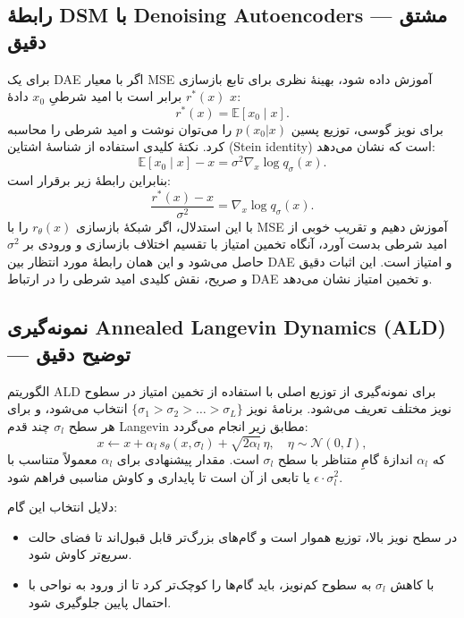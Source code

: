 \subsection{رابطهٔ DSM با Denoising Autoencoders — مشتق دقیق}
برای یک DAE اگر با معیار MSE آموزش داده شود، بهینهٔ نظری برای تابع بازسازی $r^*(x)$ برابر است با امید شرطیِ $x_0$ دادهٔ $x$:
\begin{equation}
r^*(x) = \mathbb{E}[x_0 \mid x].
\end{equation}
برای نویز گوسی، توزیع پسین $p(x_0|x)$ را می‌توان نوشت و امید شرطی را محاسبه کرد. نکتهٔ کلیدی استفاده از شناسهٔ اشتاین (Stein identity) است که نشان می‌دهد:
\begin{equation}\label{eq:dae_posterior}
\mathbb{E}[x_0 \mid x] - x = \sigma^2 \nabla_x \log q_{\sigma}(x).
\end{equation}
بنابراین رابطهٔ زیر برقرار است:
\begin{equation}
\frac{r^*(x) - x}{\sigma^2} = \nabla_x \log q_{\sigma}(x).
\end{equation}
با این استدلال، اگر شبکهٔ بازسازی $r_{\theta}(x)$ را با MSE آموزش دهیم و تقریب خوبی از امید شرطی بدست آورد، آنگاه تخمین امتیاز با تقسیم اختلاف بازسازی و ورودی بر $\sigma^2$ حاصل می‌شود و این همان رابطهٔ مورد انتظار بین DAE و امتیاز است. این اثبات دقیق و صریح، نقش کلیدی امید شرطی را در ارتباط DAE و تخمین امتیاز نشان می‌دهد.

\subsection{نمونه‌گیری Annealed Langevin Dynamics (ALD) — توضیح دقیق}
الگوریتم ALD برای نمونه‌گیری از توزیع اصلی با استفاده از تخمین امتیاز در سطوح نویز مختلف تعریف می‌شود. برنامهٔ نویز \(\{\sigma_1>\sigma_2>\dots>\sigma_L\}\) انتخاب می‌شود، و برای هر سطح \(\sigma_l\) چند قدم Langevin مطابق زیر انجام می‌گردد:
\begin{equation}\label{eq:ald_step}
x \leftarrow x + \alpha_l\, s_{\theta}(x,\sigma_l) + \sqrt{2\alpha_l}\,\eta, \quad \eta\sim\mathcal{N}(0,I),
\end{equation}
که \(\alpha_l\) اندازهٔ گامِ متناظر با سطح \(\sigma_l\) است. مقدار پیشنهادی برای \(\alpha_l\) معمولاً متناسب با \(\epsilon \cdot \sigma_l^2\) یا تابعی از آن است تا پایداری و کاوش مناسبی فراهم شود.

دلایل انتخاب این گام:
\begin{itemize}
    \item در سطح نویز بالا، توزیع هموار است و گام‌های بزرگ‌تر قابل قبول‌اند تا فضای حالت سریع‌تر کاوش شود.
    \item با کاهش \(\sigma_l\) به سطوح کم‌نویز، باید گام‌ها را کوچک‌تر کرد تا از ورود به نواحی با احتمال پایین جلوگیری شود.
\end{itemize}

